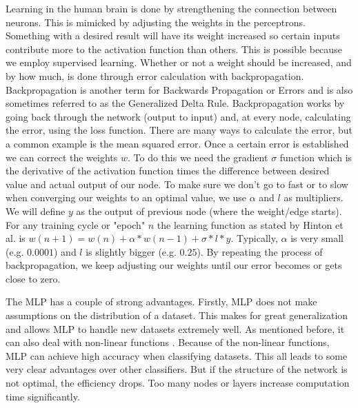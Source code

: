 Learning in the human brain is done by strengthening the connection between neurons. This is mimicked by adjusting the weights in the perceptrons. Something with a desired result will have its weight increased so certain inputs contribute more to the activation function than others. This is possible because we employ supervised learning. Whether or not a weight should be increased, and by how much, is done through error calculation with backpropagation. Backpropagation is another term for Backwards Propagation or Errors \cite{rumelhart1985learning} and is also sometimes referred to as the Generalized Delta Rule. Backpropagation works by going back through the network (output to input) and, at every node, calculating the error, using the loss function. There are many ways to calculate the error, but a common example is the mean squared error. Once a certain error is established we can correct the weights $w$. To do this we need the gradient $\sigma$ function which is the derivative of the activation function times the difference between desired value and actual output of our node. To make sure we don't go to fast or to slow when converging our weights to an optimal value, we use $\alpha$ and $l$ as multipliers. We will define $y$ as the output of previous node (where the weight/edge starts). For any training cycle or "epoch" $n$ the learning function as stated by Hinton et al. is $w(n+1)=w(n) + \alpha * w(n-1) + \sigma * l * y$. Typically, $\alpha$ is very small (e.g. $0.0001$) and $l$ is slightly bigger (e.g. $0.25$). By repeating the process of backpropagation, we keep adjusting our weights until our error becomes or gets close to zero.

The MLP has a couple of strong advantages. Firstly, MLP does not make assumptions on the distribution of a dataset. This makes for great generalization and allows MLP to handle new datasets extremely well. As mentioned before, it can also deal with non-linear functions \cite{gardner1998artificial}. Because of the non-linear functions, MLP can achieve high accuracy when classifying datasets. This all leads to some very clear advantages over other classifiers. But if the structure of the network is not optimal, the efficiency drops. Too many nodes or layers increase computation time significantly.